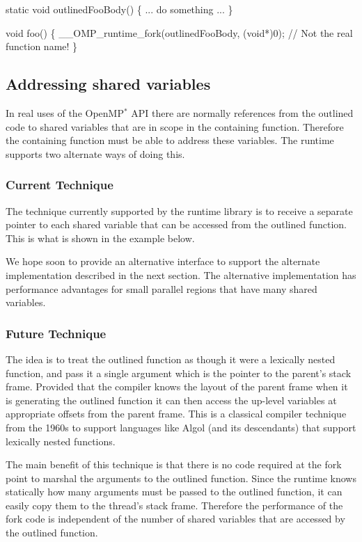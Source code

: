 \begin{DoxyCode}
\textcolor{keyword}{static} \textcolor{keywordtype}{void} outlinedFooBody()
\{
    ... \textcolor{keywordflow}{do} something ...
\}

\textcolor{keywordtype}{void} foo()
\{
    \_\_OMP\_runtime\_fork(outlinedFooBody, (\textcolor{keywordtype}{void}*)0);   \textcolor{comment}{// Not the real function name!}
\}
\end{DoxyCode}
\hypertarget{index_SEC_SHAREDVARS}{}\subsection{Addressing shared variables}\label{index_SEC_SHAREDVARS}
In real uses of the Open\-M\-P$^{\mbox{$\ast$}}$  A\-P\-I there are normally references from the outlined code to shared variables that are in scope in the containing function. Therefore the containing function must be able to address these variables. The runtime supports two alternate ways of doing this.\hypertarget{index_SEC_SEC_OT}{}\subsubsection{Current Technique}\label{index_SEC_SEC_OT}
The technique currently supported by the runtime library is to receive a separate pointer to each shared variable that can be accessed from the outlined function. This is what is shown in the example below.

We hope soon to provide an alternative interface to support the alternate implementation described in the next section. The alternative implementation has performance advantages for small parallel regions that have many shared variables.\hypertarget{index_SEC_SEC_PT}{}\subsubsection{Future Technique}\label{index_SEC_SEC_PT}
The idea is to treat the outlined function as though it were a lexically nested function, and pass it a single argument which is the pointer to the parent's stack frame. Provided that the compiler knows the layout of the parent frame when it is generating the outlined function it can then access the up-\/level variables at appropriate offsets from the parent frame. This is a classical compiler technique from the 1960s to support languages like Algol (and its descendants) that support lexically nested functions.

The main benefit of this technique is that there is no code required at the fork point to marshal the arguments to the outlined function. Since the runtime knows statically how many arguments must be passed to the outlined function, it can easily copy them to the thread's stack frame. Therefore the performance of the fork code is independent of the number of shared variables that are accessed by the outlined function.

